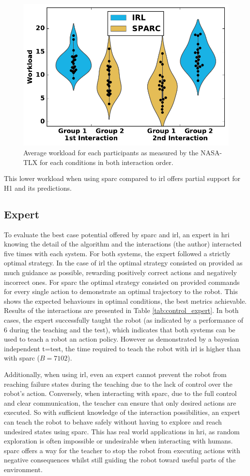 \begin{figure}[ht]
	\includegraphics[width=.5\textwidth]{workload.pdf}
	\centering
	\caption{Average workload for each participants as measured by the NASA-TLX for each conditions in both interaction order.
	}
	\label{fig:control_workload}
\end{figure}

This lower workload when using \gls{sparc} compared to \gls{irl} offers partial support for H1 and its predictions.

\subsection{Expert} \label{ssec:control_expert}

To evaluate the best case potential offered by \gls{sparc} and \gls{irl}, an expert in \gls{hri} knowing the detail of the algorithm and the interactions (the author) interacted five times with each system. For both systems, the expert followed a strictly optimal strategy. In the case of \gls{irl} the optimal strategy consisted on provided as much guidance as possible, rewarding positively correct actions and negatively incorrect ones. For \gls{sparc} the optimal strategy consisted on provided commands for every single action to demonstrate an optimal trajectory to the robot. This shows the expected behaviours in optimal conditions, the best metrics achievable. Results of the interactions are presented in Table \ref{tab:control_expert}. In both cases, the expert successfully taught the robot (as indicated by a performance of 6 during the teaching and the test), which indicates that both systems can be used to teach a robot an action policy. However as demonstrated by a bayesian independent t=test, the time required to teach the robot with \gls{irl} is higher than with \gls{sparc} ($B=7102$). 

Additionally, when using \gls{irl}, even an expert cannot prevent the robot from reaching failure states during the teaching due to the lack of control over the robot's action. Conversely, when interacting with \gls{sparc}, due to the full control and clear communication, the teacher can ensure that only desired actions are executed. So with sufficient knowledge of the interaction possibilities, an expert can teach the robot to behave safely without having to explore and reach undesired states using \gls{sparc}. This has real world applications in \gls{hri}, as random exploration is often impossible or undesirable when interacting with humans. \gls{sparc} offers a way for the teacher to stop the robot from executing actions with negative consequences whilst still guiding the robot toward useful parts of the environment.

